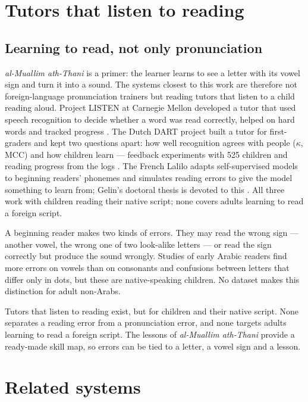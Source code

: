 \section{Tutors that listen to reading}\label{sec:lr-tutors}

\subsection{Learning to read, not only pronunciation}

\emph{al-Muallim ath-Thani} is a primer: the learner learns to see a letter with its vowel sign and turn it into
a sound. The systems closest to this work are therefore not foreign-language pronunciation trainers but
reading tutors that listen to a child reading aloud. Project LISTEN at Carnegie Mellon
developed a tutor that used speech recognition to decide whether a word was read correctly, helped on hard
words and tracked progress \cite{SRC-125}. The Dutch DART project built a tutor for first-graders and kept two
questions apart: how well recognition agrees with people ($\kappa$, MCC) and how children learn --- feedback
experiments with 525 children and reading progress from the logs \cite{SRC-130,SRC-131}. The French
Lalilo adapts self-supervised models to beginning readers' phonemes and simulates reading errors to give the
model something to learn from; Gelin's doctoral thesis is devoted to this \cite{SRC-132,SRC-133}. All three
work with children reading their native script; none covers adults learning to read a foreign script.

A beginning reader makes two kinds of errors. They may read the wrong sign --- another vowel, the wrong one of
two look-alike letters --- or read the sign correctly but produce the sound wrongly. Studies of early Arabic
readers find more errors on vowels than on consonants and confusions between letters that differ only in
dots, but these are native-speaking children. No dataset makes this distinction for adult non-Arabs.

\begin{keybox}[Implication]
Tutors that listen to reading exist, but for children and their native script. None separates a reading error
from a pronunciation error, and none targets adults learning to read a foreign script. The lessons of
\emph{al-Muallim ath-Thani} provide a ready-made skill map, so errors can be tied to a letter, a vowel sign and a
lesson.
\end{keybox}

\section{Related systems}\label{sec:lr-related}


